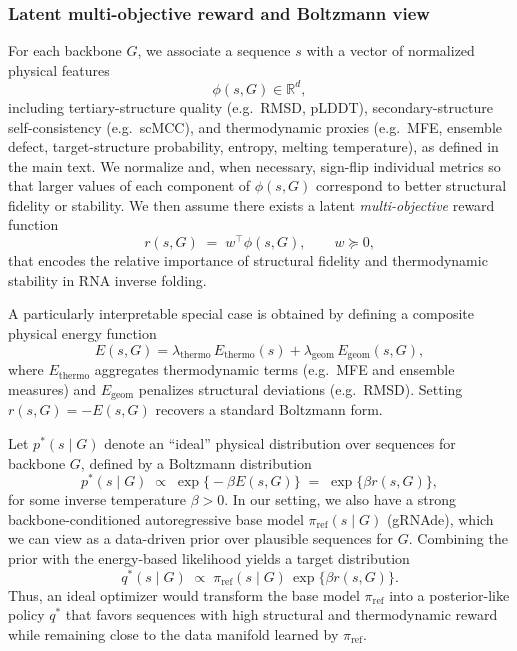 {{\subsubsection{Latent multi-objective reward and Boltzmann view}

For each backbone $G$, we associate a sequence $s$ with a vector of normalized
physical features
\begin{equation}
    \phi(s, G) \in \mathbb{R}^d,
\end{equation}
including tertiary-structure quality (e.g.\ RMSD, pLDDT), secondary-structure
self-consistency (e.g.\ scMCC), and thermodynamic proxies (e.g.\ MFE,
ensemble defect, target-structure probability, entropy, melting temperature),
as defined in the main text. We normalize and, when necessary, sign-flip
individual metrics so that larger values of each component of
$\phi(s,G)$ correspond to better structural fidelity or stability. We then
assume there exists a latent \emph{multi-objective} reward function
\begin{equation}
    r(s, G) \;=\; w^\top \phi(s, G),
    \qquad w \succeq 0,
    \label{eq:latent-reward}
\end{equation}
that encodes the relative importance of structural fidelity and
thermodynamic stability in RNA inverse folding.

A particularly interpretable special case is obtained by defining a composite
physical energy function
\begin{equation}
    E(s, G)
    =
    \lambda_{\text{thermo}} \, E_{\text{thermo}}(s)
    +
    \lambda_{\text{geom}} \, E_{\text{geom}}(s, G),
\end{equation}
where $E_{\text{thermo}}$ aggregates thermodynamic terms (e.g.\ MFE and
ensemble measures) and $E_{\text{geom}}$ penalizes structural deviations
(e.g.\ RMSD). Setting $r(s,G) = -E(s,G)$ recovers a standard Boltzmann form.

Let $p^*(s \mid G)$ denote an ``ideal'' physical distribution over sequences
for backbone $G$, defined by a Boltzmann distribution
\begin{equation}
    p^*(s \mid G)
    \;\propto\;
    \exp\bigl\{-\beta E(s, G)\bigr\}
    \;=\;
    \exp\bigl\{\beta r(s, G)\bigr\},
    \label{eq:boltzmann-physical}
\end{equation}
for some inverse temperature $\beta > 0$.
In our setting, we also have a strong backbone-conditioned autoregressive
base model $\pi_{\text{ref}}(s \mid G)$ (gRNAde), which we can view as a
data-driven prior over plausible sequences for $G$. Combining the prior
with the energy-based likelihood yields a target distribution
\begin{equation}
    q^*(s \mid G)
    \;\propto\;
    \pi_{\text{ref}}(s \mid G)\,\exp\bigl\{\beta r(s, G)\bigr\}.
    \label{eq:target-posterior}
\end{equation}
Thus, an ideal optimizer would transform the base model $\pi_{\text{ref}}$
into a posterior-like policy $q^*$ that favors sequences with high
structural and thermodynamic reward while remaining close to the data
manifold learned by $\pi_{\text{ref}}$.

}}
